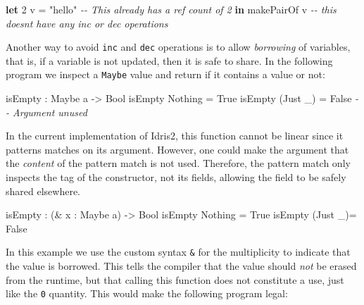 \documentclass[
]{article}
\newenvironment{Shaded}{}{}
\newcommand{\CommentTok}[1]{\textcolor[rgb]{0.38,0.63,0.69}{\textit{#1}}}
\newcommand{\DataTypeTok}[1]{\textcolor[rgb]{0.56,0.13,0.00}{#1}}
\newcommand{\DecValTok}[1]{\textcolor[rgb]{0.25,0.63,0.44}{#1}}
\newcommand{\KeywordTok}[1]{\textcolor[rgb]{0.00,0.44,0.13}{\textbf{#1}}}
\newcommand{\NormalTok}[1]{#1}
\newcommand{\OperatorTok}[1]{\textcolor[rgb]{0.40,0.40,0.40}{#1}}
\newcommand{\OtherTok}[1]{\textcolor[rgb]{0.00,0.44,0.13}{#1}}
\newcommand{\StringTok}[1]{\textcolor[rgb]{0.25,0.44,0.63}{#1}}
\begin{document}
\begin{Shaded}
\begin{Highlighting}[]
\KeywordTok{let} \DecValTok{2}\NormalTok{ v }\OtherTok{=} \StringTok{"hello"} \CommentTok{{-}{-} This already has a ref count of 2}
 \KeywordTok{in}\NormalTok{ makePairOf v }\CommentTok{{-}{-} this doesn\textquotesingle{}t have any inc or dec operations}
\end{Highlighting}
\end{Shaded}

Another way to avoid \texttt{inc} and \texttt{dec} operations is to
allow \emph{borrowing} of variables, that is, if a variable is not
updated, then it is safe to share. In the following program we inspect a
\texttt{Maybe} value and return if it contains a value or not:

\begin{Shaded}
\begin{Highlighting}[]
\NormalTok{isEmpty }\OperatorTok{:} \DataTypeTok{Maybe}\NormalTok{ a }\OtherTok{{-}\textgreater{}} \DataTypeTok{Bool}
\NormalTok{isEmpty }\DataTypeTok{Nothing} \OtherTok{=} \DataTypeTok{True}
\NormalTok{isEmpty (}\DataTypeTok{Just}\NormalTok{ \_) }\OtherTok{=} \DataTypeTok{False} \CommentTok{{-}{-} Argument unused}
\end{Highlighting}
\end{Shaded}

In the current implementation of Idris2, this function cannot be linear
since it patterns matches on its argument. However, one could make the
argument that the \emph{content} of the pattern match is not used.
Therefore, the pattern match only inspects the tag of the constructor,
not its fields, allowing the field to be safely shared elsewhere.

\begin{Shaded}
\begin{Highlighting}[]
\NormalTok{isEmpty }\OperatorTok{:}\NormalTok{ (}\OperatorTok{\&}\NormalTok{ x }\OperatorTok{:} \DataTypeTok{Maybe}\NormalTok{ a) }\OtherTok{{-}\textgreater{}} \DataTypeTok{Bool}
\NormalTok{isEmpty }\DataTypeTok{Nothing} \OtherTok{=} \DataTypeTok{True}
\NormalTok{isEmpty (}\DataTypeTok{Just}\NormalTok{ \_)}\OtherTok{=} \DataTypeTok{False}
\end{Highlighting}
\end{Shaded}

In this example we use the custom syntax \texttt{\&} for the
multiplicity to indicate that the value is borrowed. This tells the
compiler that the value should \emph{not} be erased from the runtime,
but that calling this function does not constitute a use, just like the
\texttt{0} quantity. This would make the following program legal:
\end{document}
